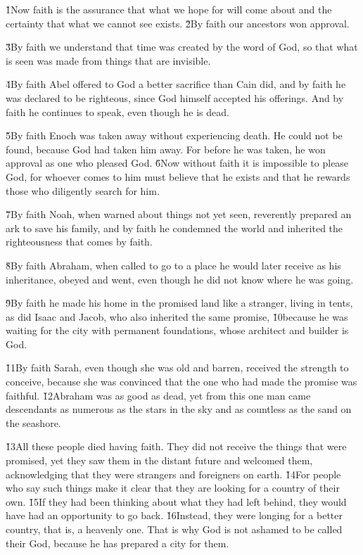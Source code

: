 \v{1}Now faith is the assurance that what we hope for will come about and the certainty that what we cannot see exists. \v{2}By faith our ancestors won approval.

\v{3}By faith we understand that time was created by the word of God, so that what is seen was made from things that are invisible.

\v{4}By faith Abel offered to God a better sacrifice than Cain did, and by faith he was declared to be righteous, since God himself accepted his offerings. And by faith he continues to speak, even though he is dead.

\v{5}By faith Enoch was taken away without experiencing death. He could not be found, because God had taken him away. For before he was taken, he won approval as one who pleased God. \v{6}Now without faith it is impossible to please God, for whoever comes to him must believe that he exists and that he rewards those who diligently search for him.

\v{7}By faith Noah, when warned about things not yet seen, reverently prepared an ark to save his family, and by faith he condemned the world and inherited the righteousness that comes by faith.

\v{8}By faith Abraham, when called to go to a place he would later receive as his inheritance, obeyed and went, even though he did not know where he was going.

\v{9}By faith he made his home in the promised land like a stranger, living in tents, as did Isaac and Jacob, who also inherited the same promise, \v{10}because he was waiting for the city with permanent foundations, whose architect and builder is God.

\v{11}By faith Sarah, even though she was old and barren, received the strength to conceive, because she was convinced that the one who had made the promise was faithful. \v{12}Abraham was as good as dead, yet from this one man came descendants as numerous as the stars in the sky and as countless as the sand on the seashore.

\v{13}All these people died having faith. They did not receive the things that were promised, yet they saw them in the distant future and welcomed them, acknowledging that they were strangers and foreigners on earth. \v{14}For people who say such things make it clear that they are looking for a country of their own. \v{15}If they had been thinking about what they had left behind, they would have had an opportunity to go back. \v{16}Instead, they were longing for a better country, that is, a heavenly one. That is why God is not ashamed to be called their God, because he has prepared a city for them.

